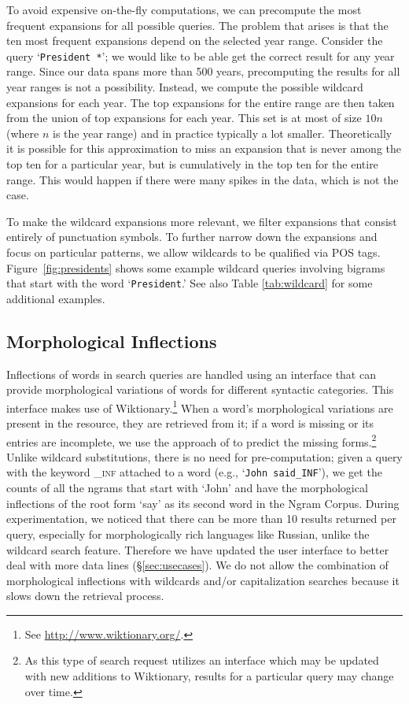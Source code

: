 \documentclass[11pt,a4paper]{article}
\newcommand{\query}[1]{\texttt{#1}}
\begin{document}
 To avoid expensive on-the-fly computations, we can precompute the most frequent expansions for all possible queries. The problem that arises is that the ten most frequent expansions depend on the selected year range. Consider the query `\query{President *}'; we would like to be able get the correct result for any year range. Since our data spans more than 500 years, precomputing the results for all year ranges is not a possibility. Instead, we compute the possible wildcard expansions for each year. The top expansions for the entire range are then taken from the union of top expansions for each year. This set is at most of size $10n$ (where $n$ is the year range) and in practice typically a lot smaller. Theoretically it is possible for this approximation to miss an expansion that is never among the top ten for a particular year, but is cumulatively in the top ten for the entire range. This would happen if there were many spikes in the data, which is not the case.

	To make the wildcard expansions more relevant, we filter expansions that consist entirely of punctuation symbols. To further narrow down the expansions and focus on particular patterns, we allow wildcards to be qualified via POS tags. Figure~\ref{fig:presidents} shows some example wildcard queries involving bigrams that start with the word `\query{President}.' See also Table \ref{tab:wildcard} for some additional examples.

\subsection{Morphological Inflections}\label{sec:morph}
Inflections of words in search queries are handled using an interface that can provide morphological variations of words for different syntactic categories. This interface makes use of Wiktionary.\footnote{See \url{http://www.wiktionary.org/}.} When a word's
morphological variations are present in the resource, they are retrieved from it; if a word is missing or its entries are incomplete, we use the approach of  to predict the missing forms.\footnote{As this type of search request utilizes an interface which may be updated with new additions to Wiktionary, results for a particular query may change over time.} Unlike wildcard substitutions, there is no need for pre-computation; given a query with the keyword \textsf{\textsc{\_inf}} attached to a word (e.g., `\query{John said\_INF}'), we get the counts of all the ngrams that start with `John' and have the morphological inflections of the root form `say' as its second word in the Ngram Corpus. During experimentation, we noticed that there can be more than 10 results returned per query, especially for morphologically rich languages like Russian, unlike the wildcard search feature. Therefore we have updated the user interface to better deal with more data lines (\S\ref{sec:usecases}). We do not allow the combination of morphological inflections with wildcards and/or capitalization searches because it slows down the retrieval process.
\end{document}

